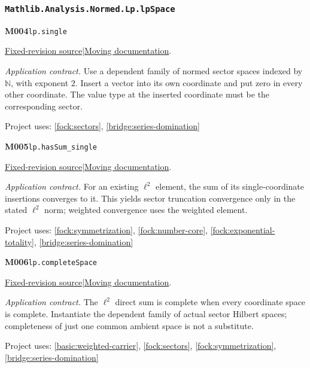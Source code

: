 \documentclass[11pt,a4paper]{article}
\theoremstyle{definition}
\theoremstyle{remark}
\begin{document}
\subsubsection*{\nolinkurl{Mathlib.Analysis.Normed.Lp.lpSpace}}
\noindent\textbf{M004}\label{base:M004}\quad\nolinkurl{lp.single}

\href{https://github.com/leanprover-community/mathlib4/blob/9bac2d0692944a775113f7c130fd5e5b4608a854/Mathlib/Analysis/Normed/Lp/lpSpace.lean}{Fixed-revision source}\quad|\quad\href{https://leanprover-community.github.io/mathlib4_docs/Mathlib/Analysis/Normed/Lp/lpSpace.html#lp.single}{Moving documentation}.\par
\noindent\textit{Application contract.} Use a dependent family of normed sector spaces indexed by $\mathbb N$, with exponent $2$. Insert a vector into its own coordinate and put zero in every other coordinate. The value type at the inserted coordinate must be the corresponding sector.\par
{\small Project uses: \ref{fock:sectors}, \ref{bridge:series-domination}}\par\medskip

\noindent\textbf{M005}\label{base:M005}\quad\nolinkurl{lp.hasSum_single}

\href{https://github.com/leanprover-community/mathlib4/blob/9bac2d0692944a775113f7c130fd5e5b4608a854/Mathlib/Analysis/Normed/Lp/lpSpace.lean}{Fixed-revision source}\quad|\quad\href{https://leanprover-community.github.io/mathlib4_docs/Mathlib/Analysis/Normed/Lp/lpSpace.html#lp.hasSum_single}{Moving documentation}.\par
\noindent\textit{Application contract.} For an existing $\ell^2$ element, the sum of its single-coordinate insertions converges to it. This yields sector truncation convergence only in the stated $\ell^2$ norm; weighted convergence uses the weighted element.\par
{\small Project uses: \ref{fock:symmetrization}, \ref{fock:number-core}, \ref{fock:exponential-totality}, \ref{bridge:series-domination}}\par\medskip

\noindent\textbf{M006}\label{base:M006}\quad\nolinkurl{lp.completeSpace}

\href{https://github.com/leanprover-community/mathlib4/blob/9bac2d0692944a775113f7c130fd5e5b4608a854/Mathlib/Analysis/Normed/Lp/lpSpace.lean}{Fixed-revision source}\quad|\quad\href{https://leanprover-community.github.io/mathlib4_docs/Mathlib/Analysis/Normed/Lp/lpSpace.html#lp.completeSpace}{Moving documentation}.\par
\noindent\textit{Application contract.} The $\ell^2$ direct sum is complete when every coordinate space is complete. Instantiate the dependent family of actual sector Hilbert spaces; completeness of just one common ambient space is not a substitute.\par
{\small Project uses: \ref{basic:weighted-carrier}, \ref{fock:sectors}, \ref{fock:symmetrization}, \ref{bridge:series-domination}}\par\medskip
\end{document}
